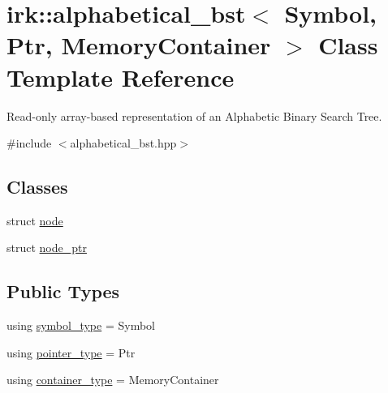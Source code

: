 \hypertarget{classirk_1_1alphabetical__bst}{}\section{irk\+:\+:alphabetical\+\_\+bst$<$ Symbol, Ptr, Memory\+Container $>$ Class Template Reference}
\label{classirk_1_1alphabetical__bst}


Read-\/only array-\/based representation of an Alphabetic Binary Search Tree.  




{\ttfamily \#include $<$alphabetical\+\_\+bst.\+hpp$>$}

\subsection*{Classes}
\begin{DoxyCompactItemize}
\item 
struct \mbox{\hyperlink{structirk_1_1alphabetical__bst_1_1node}{node}}
\item 
struct \mbox{\hyperlink{structirk_1_1alphabetical__bst_1_1node__ptr}{node\+\_\+ptr}}
\end{DoxyCompactItemize}
\subsection*{Public Types}
\begin{DoxyCompactItemize}
\item 
using \mbox{\hyperlink{classirk_1_1alphabetical__bst_a296ccb8fa9fa9dce3b3c3beab0a5ca28}{symbol\+\_\+type}} = Symbol
\item 
using \mbox{\hyperlink{classirk_1_1alphabetical__bst_ae689c05ab96a71769e24908d5c73765c}{pointer\+\_\+type}} = Ptr
\item 
using \mbox{\hyperlink{classirk_1_1alphabetical__bst_aeed9efc6a48ff6d504a608e06223f386}{container\+\_\+type}} = Memory\+Container
\end{DoxyCompactItemize}
